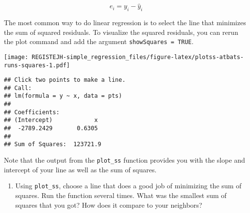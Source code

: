 \documentclass[
]{article}
\newenvironment{Shaded}{\begin{snugshade}}{\end{snugshade}}
\newcommand{\CommentTok}[1]{\textcolor[rgb]{0.56,0.35,0.01}{\textit{#1}}}
\newcommand{\DataTypeTok}[1]{\textcolor[rgb]{0.13,0.29,0.53}{#1}}
\newcommand{\KeywordTok}[1]{\textcolor[rgb]{0.13,0.29,0.53}{\textbf{#1}}}
\newcommand{\NormalTok}[1]{#1}
\newcommand{\OperatorTok}[1]{\textcolor[rgb]{0.81,0.36,0.00}{\textbf{#1}}}
\newcommand{\OtherTok}[1]{\textcolor[rgb]{0.56,0.35,0.01}{#1}}
\providecommand{\tightlist}{%
  \setlength{\itemsep}{0pt}\setlength{\parskip}{0pt}}
\begin{document}
\[
  e_i = y_i - \hat{y}_i
\]

The most common way to do linear regression is to select the line that
minimizes the sum of squared residuals. To visualize the squared
residuals, you can rerun the plot command and add the argument
\texttt{showSquares\ =\ TRUE}.

\begin{Shaded}
\end{Shaded}

\texttt{[image: REGISTEJH-simple\_regression\_files/figure-latex/plotss-atbats-runs-squares-1.pdf]}

\begin{verbatim}
## Click two points to make a line.                                
## Call:
## lm(formula = y ~ x, data = pts)
## 
## Coefficients:
## (Intercept)            x  
##  -2789.2429       0.6305  
## 
## Sum of Squares:  123721.9
\end{verbatim}

Note that the output from the \texttt{plot\_ss} function provides you
with the slope and intercept of your line as well as the sum of squares.

\begin{enumerate}
\def\labelenumi{\arabic{enumi}.}
\setcounter{enumi}{2}
\tightlist
\item
  Using \texttt{plot\_ss}, choose a line that does a good job of
  minimizing the sum of squares. Run the function several times. What
  was the smallest sum of squares that you got? How does it compare to
  your neighbors?
\end{enumerate}

\begin{Shaded}
\end{Shaded}
\end{document}
